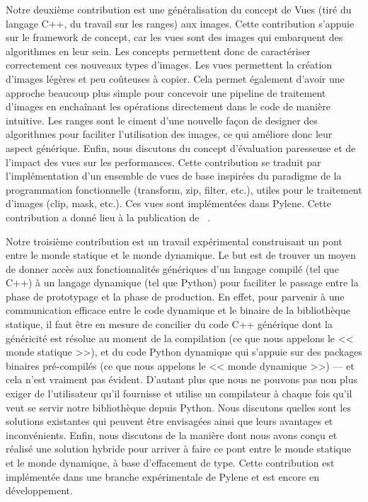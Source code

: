 \documentclass[11pt,a4paper,sans]{article} %
\begin{document}
Notre deuxième contribution est une généralisation du concept de Vues (tiré du langage C++, du travail sur les ranges)
aux images. Cette contribution s'appuie sur le framework de concept, car les vues sont des images qui embarquent des
algorithmes en leur sein. Les concepts permettent donc de caractériser correctement ces nouveaux types d'images. Les
vues permettent la création d'images légères et peu coûteuses à copier. Cela permet également d'avoir une approche
beaucoup plus simple pour concevoir une pipeline de traitement d'images en enchaînant les opérations directement dans le
code de manière intuitive. Les ranges sont le ciment d'une nouvelle façon de designer des algorithmes pour faciliter
l'utilisation des images, ce qui améliore donc leur aspect générique. Enfin, nous discutons du concept d'évaluation
paresseuse et de l'impact des vues sur les performances. Cette contribution se traduit par l'implémentation d'un
ensemble de vues de base inspirées du paradigme de la programmation fonctionnelle (transform, zip, filter, etc.), utiles
pour le traitement d'images (clip, mask, etc.). Ces vues sont implémentées dans Pylene. Cette contribution a donné lieu
à la publication de ~\parencite{roynard.2022.gpce}.

Notre troisième contribution est un travail expérimental construisant un pont entre le monde statique et le monde
dynamique. Le but est de trouver un moyen de donner accès aux fonctionnalités génériques d'un langage compilé (tel que
C++) à un langage dynamique (tel que Python) pour faciliter le passage entre la phase de prototypage et la phase de
production. En effet, pour parvenir à une communication efficace entre le code dynamique et le binaire de la
bibliothèque statique, il faut être en mesure de concilier du code C++ générique dont la généricité est résolue au
moment de la compilation (ce que nous appelons le << monde statique >>), et du code Python dynamique qui s'appuie sur
des packages binaires pré-compilés (ce que nous appelons le << monde dynamique >>) --- et cela n'est vraiment pas
évident. D'autant plus que nous ne pouvons pas non plus exiger de l'utilisateur qu'il fournisse et utilise un
compilateur à chaque fois qu'il veut se servir notre bibliothèque depuis Python. Nous discutons quelles sont les
solutions existantes qui peuvent être envisagées ainsi que leurs avantages et inconvénients. Enfin, nous discutons de la
manière dont nous avons conçu et réalisé une solution hybride pour arriver à faire ce pont entre le monde statique et le
monde dynamique, à base d'effacement de type. Cette contribution est implémentée dans une branche expérimentale de
Pylene et est encore en développement.
\end{document}
